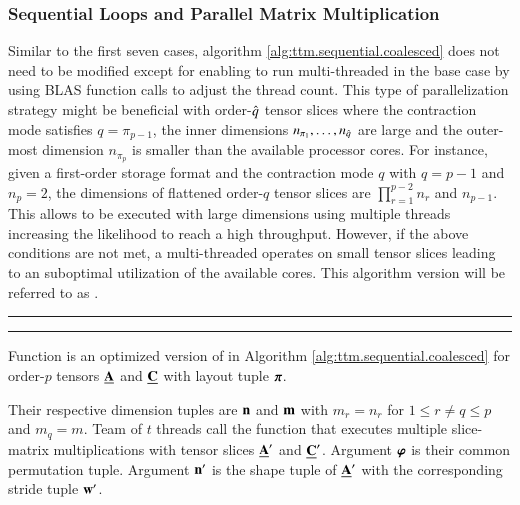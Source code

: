 \subsubsection{Sequential Loops and Parallel Matrix Multiplication}
Similar to the first seven cases, algorithm \ref{alg:ttm.sequential.coalesced} does not need to be modified except for enabling  to run multi-threaded in the base case by using BLAS function calls to adjust the thread count.
This type of parallelization strategy might be beneficial with order-$\hat{q}$ tensor slices where the contraction mode satisfies $q = \pi_{p-1}$, the inner dimensions $n_{\pi_1},\dots,n_{\hat{q}}$ are large and the outer-most dimension $n_{\pi_{p}}$ is smaller than the available processor cores.
For instance, given a first-order storage format and the contraction mode $q$ with $q=p-1$ and $n_p=2$, the dimensions of flattened order-$q$ tensor slices are $\prod_{r=1}^{p-2}n_r$ and $n_{p-1}$.
This allows  to be executed with large dimensions using multiple threads increasing the likelihood to reach a high throughput.
However, if the above conditions are not met, a multi-threaded  operates on small tensor slices leading to an suboptimal utilization of the available cores.
This algorithm version will be referred to as .


\begin{algorithm}[t]
\footnotesize
\DontPrintSemicolon
\SetAlgoVlined
{}
%
%
\hrule
\BlankLine
{}
{	
	{
		{
			\;
		}
	}
}
\BlankLine
\hrule
{
\footnotesize
Function  is an optimized version of  in Algorithm \ref{alg:ttm.sequential.coalesced} for order-$p$ tensors $\underline{\mathbf{A}}$ and $\underline{\mathbf{C}}$ with layout tuple $\boldsymbol{\pi}$.
 
Their respective dimension tuples are $\mathbf{n}$ and $\mathbf{m}$ with $m_{r} = n_{r}$ for $1 \leq r \neq q \leq p$ and $m_q = m$.
Team of $t$ threads call the  function that executes multiple slice-matrix multiplications with tensor slices $\underline{\mathbf{A}}'$ and $\underline{\mathbf{C}}'$.
Argument $\boldsymbol{\varphi}$ is their common permutation tuple.
Argument $\mathbf{n}'$ is the shape tuple of $\underline{\mathbf{A}}'$ with the corresponding stride tuple $\mathbf{w}'$.
\label{alg:ttm.slice.fused.parallel}
}
\end{algorithm}


